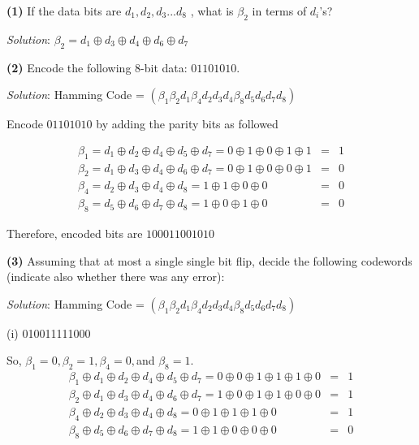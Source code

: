 \documentclass[a4paper, 11pt]{article}
\renewcommand{\part}[1] {\vspace{.10in} {\bf (#1)}}
\begin{document}
	\part{1} If the data bits are $d_1,d_2,d_3...d_8$ , what is $\beta_2$ in terms of $d_i$’s?
	
	{\em Solution}: $\beta_2 = d_1 \oplus d_3 \oplus d_4 \oplus d_6 \oplus d_7$
	
	\part{2} Encode the following 8-bit data: $01101010$.
	
	{\em Solution}: Hamming Code = $(\beta_1 \beta_2 d_1 \beta_4 d_2 d_3 d_4 \beta_8 d_5 d_6 d_7 d_8)$
	
	Encode $01101010$ by adding the parity bits as followed
	
	\begin{eqnarray}
	\beta_1 = d_1 \oplus d_2 \oplus d_4 \oplus d_5 \oplus d_7 = 0 \oplus 1 \oplus 0 \oplus 1 \oplus 1 &=& 1\\
	\beta_2 = d_1 \oplus d_3 \oplus d_4 \oplus d_6 \oplus d_7  = 0 \oplus 1 \oplus 0 \oplus 0 \oplus 1 &=& 0\\
	\beta_4 = d_2 \oplus d_3 \oplus d_4 \oplus d_8 = 1 \oplus 1 \oplus 0 \oplus 0 &=& 0\\
	\beta_8 = d_5 \oplus d_6 \oplus d_7 \oplus d_8 = 1 \oplus 0 \oplus 1 \oplus 0 &=& 0
	\end{eqnarray}
	
	Therefore, encoded bits are $1 0 0 0 110 0 1010$
	
	\part{3} Assuming that at most a single single bit flip, decide the following codewords (indicate also whether there was any error):
	
	{\em Solution}: 
	Hamming Code = $(\beta_1 \beta_2 d_1 \beta_4 d_2 d_3 d_4 \beta_8 d_5 d_6 d_7 d_8)$
	
	(i) 010011111000
	
	So, $\beta_1 = 0, \beta_2 = 1, \beta_4 = 0,$and $\beta_8 = 1$.
	\begin{eqnarray}
	\beta_1 \oplus d_1 \oplus d_2 \oplus d_4 \oplus d_5 \oplus d_7 = 0 \oplus 0 \oplus 1 \oplus 1 \oplus 1 \oplus 0 &=& 1\\
	\beta_2 \oplus d_1 \oplus d_3 \oplus d_4 \oplus d_6 \oplus d_7 = 1 \oplus 0 \oplus 1 \oplus 1 \oplus 0 \oplus 0 &=& 1\\
	\beta_4 \oplus d_2 \oplus d_3 \oplus d_4 \oplus d_8 = 0 \oplus 1 \oplus 1\oplus 1 \oplus 0 &=& 1\\
	\beta_8 \oplus d_5 \oplus d_6 \oplus d_7 \oplus d_8 = 1 \oplus 1 \oplus 0 \oplus 0 \oplus 0 &=& 0
	\end{eqnarray}
	
\end{document}
